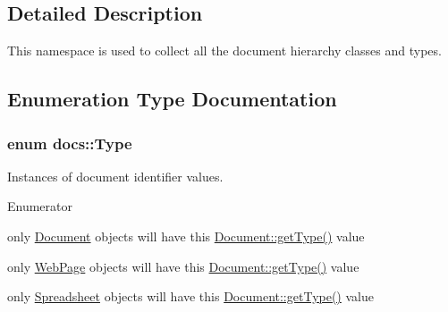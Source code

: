 \subsection{Detailed Description}
This namespace is used to collect all the document hierarchy classes and types. 

\subsection{Enumeration Type Documentation}
\hypertarget{namespacedocs_a150efca62822b8ab62a5afabe299bf75}{
\subsubsection[{Type}]{\setlength{\rightskip}{0pt plus 5cm}enum {\bf docs\-::\-Type}}}\label{namespacedocs_a150efca62822b8ab62a5afabe299bf75}


Instances of document identifier values. 

\begin{Desc}
\item[Enumerator]\par
\begin{description}
\item[{\em 
\hypertarget{namespacedocs_a150efca62822b8ab62a5afabe299bf75ab5b85a2de45c75c8eb58ccb377a01543}{D\-O\-C\-U\-M\-E\-N\-T}\label{namespacedocs_a150efca62822b8ab62a5afabe299bf75ab5b85a2de45c75c8eb58ccb377a01543}
}]only \hyperlink{classdocs_1_1Document}{Document} objects will have this \hyperlink{classdocs_1_1Document_a5626bdb2863afb9c3dd363fc5cc1bbde}{Document\-::get\-Type()} value \item[{\em 
\hypertarget{namespacedocs_a150efca62822b8ab62a5afabe299bf75a1660685efab992a33bb802d68b4e8c13}{W\-E\-B\-\_\-\-P\-A\-G\-E}\label{namespacedocs_a150efca62822b8ab62a5afabe299bf75a1660685efab992a33bb802d68b4e8c13}
}]only \hyperlink{classdocs_1_1WebPage}{Web\-Page} objects will have this \hyperlink{classdocs_1_1Document_a5626bdb2863afb9c3dd363fc5cc1bbde}{Document\-::get\-Type()} value \item[{\em 
\hypertarget{namespacedocs_a150efca62822b8ab62a5afabe299bf75a7c469773c8012b650a4db4d9f46e343a}{S\-P\-R\-E\-A\-D\-S\-H\-E\-E\-T}\label{namespacedocs_a150efca62822b8ab62a5afabe299bf75a7c469773c8012b650a4db4d9f46e343a}
}]only \hyperlink{classdocs_1_1Spreadsheet}{Spreadsheet} objects will have this \hyperlink{classdocs_1_1Document_a5626bdb2863afb9c3dd363fc5cc1bbde}{Document\-::get\-Type()} value \end{description}
\end{Desc}


